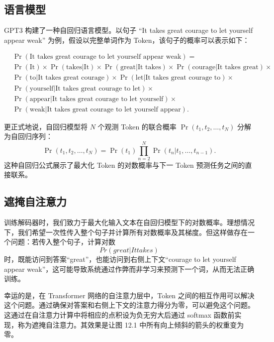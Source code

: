 \subsection{语言模型}
GPT3 构建了一种自回归语言模型。以句子 “It takes great courage to let yourself appear weak” 为例，假设以完整单词作为 Token，该句子的概率可以表示如下：

\begin{align}
&\Pr(\text{It takes great courage to let yourself appear weak}) =\\
& \Pr(\text{It}) \times \Pr(\text{takes|It}) \times \Pr(\text{great|It takes}) \times \Pr(\text{courage|It takes great}) \times \\
&\Pr(\text{to|It takes great courage}) \times \Pr(\text{let|It takes great courage to}) \times  \\
& \Pr(\text{yourself|It takes great courage to let}) \times \\
& \Pr(\text{appear|It takes great courage to let yourself}) \times \\
& \Pr(\text{weak|It takes great courage to let yourself appear}). 
\end{align} 


更正式地说，自回归模型将 \(N\) 个观测 Token 的联合概率 \(\Pr(t_1, t_2, \ldots, t_N)\) 分解为自回归序列：
\begin{equation}
\Pr(t_1, t_2, \ldots, t_N) = \Pr(t_1) \prod_{n=2}^{N} \Pr(t_n|t_1, \ldots, t_{n-1}). 
\end{equation}
这种自回归公式展示了最大化 Token 的对数概率与下一 Token 预测任务之间的直接联系。

\subsection{遮掩自注意力}
训练解码器时，我们致力于最大化输入文本在自回归模型下的对数概率。理想情况下，我们希望一次性传入整个句子并计算所有对数概率及其梯度。但这样做存在一个问题：若传入整个句子，计算对数 \begin{equation}Pr(great|It takes)\end{equation} 时，既能访问到答案“great”，也能访问到右侧上下文“courage to let yourself appear weak”，这可能导致系统通过作弊而非学习来预测下一个词，从而无法正确训练。

幸运的是，在 Transformer 网络的自注意力层中，Token 之间的相互作用可以解决这个问题。通过确保对答案和右侧上下文的注意力得分为零，可以避免这个问题。这通过在自注意力计算中将相应的点积设为负无穷大后通过 softmax 函数前实现，称为遮掩自注意力。其效果是让图 12.1 中所有向上倾斜的箭头的权重变为零。

